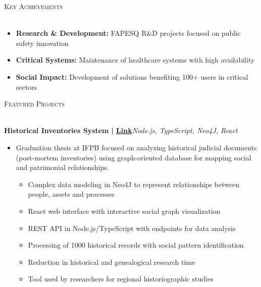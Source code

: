 \documentclass[a4paper]{article}
\newcommand{\lineunder}{
    \vspace*{-8pt} \\
    \hspace*{-18pt} \hrulefill \\
}
\newcommand{\header}[1]{
    {\hspace*{-18pt}\vspace*{6pt} \textsc{#1}}
    \vspace*{-6pt} \lineunder
}
\begin{document}
%
%
\header{Key Achievements}
\vspace{2mm}
\begin{itemize}[leftmargin=*]
    \item \textbf{Research \& Development:} FAPESQ R\&D projects focused on public safety innovation
    \item \textbf{Critical Systems:} Maintenance of healthcare systems with high availability
    \item \textbf{Social Impact:} Development of solutions benefiting 100+ users in critical sectors
\end{itemize}
\vspace{2mm}

%
%
\header{Featured Projects}
\vspace{1mm}

{\textbf{Historical Inventories System}}\textbf{ | \href{https://repositorio.ifpb.edu.br/handle/177683/2898}{Link}}\hfill{\sl Node.js, TypeScript, Neo4J, React}\\
\vspace{-3mm}
\begin{itemize} \itemsep -3pt
    \item[] Graduation thesis at IFPB focused on analyzing historical judicial documents (post-mortem inventories) using graph-oriented database for mapping social and patrimonial relationships.
        \begin{itemize}
            \item Complex data modeling in Neo4J to represent relationships between people, assets and processes
            \item React web interface with interactive social graph visualization
            \item REST API in Node.js/TypeScript with endpoints for data analysis
            \item Processing of 1000 historical records with social pattern identification
            \item Reduction in historical and genealogical research time
            \item Tool used by researchers for regional historiographic studies
        \end{itemize}
\end{itemize}
\vspace*{2mm}
\end{document}
